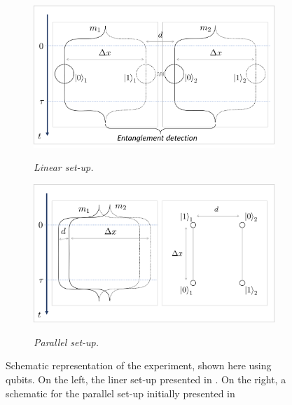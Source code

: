 \documentclass[%
 12pt,
 superscriptaddress,
 amsmath,
 amssymb,
 onecolumn,
 longbibliography
]{revtex4-2}
\begin{document}
	\begin{figure}
	    \begin{subfigure}{.49\textwidth}
    		\includegraphics[width=0.5\columnwidth]{Picture1}\par\medskip
    		\textit{Linear set-up.\label{fig:QGEMlinear1}}\par\medskip
		\end{subfigure}
	    \begin{subfigure}{.49\textwidth}
    		\includegraphics[width=.5\columnwidth]{para_topdown.png}\par\medskip
    		\textit{Parallel set-up. \label{fig:QGEMpara1}}\par\medskip
		\end{subfigure}
		\caption{Schematic representation of the experiment, shown here using qubits. On the left, the liner set-up presented in \cite{Bose2017, Marletto2017, Kamp2020}. On the right, a schematic for the parallel set-up initially presented in \cite{Nguyen2019}}\par\medskip \label{fig:QGEMinit}
	\end{figure}
\end{document}
